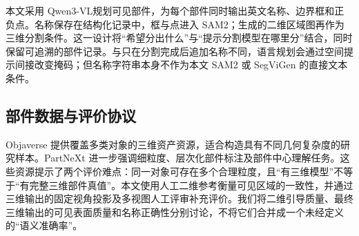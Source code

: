 本文采用 Qwen3-VL\citep{bai2025qwen3vl}规划可见部件，为每个部件同时输出英文名称、边界框和正负点。名称保存在结构化记录中，框与点进入 SAM2；生成的二维区域图再作为三维分割条件。这一设计将“希望分出什么”与“提示分割模型在哪里分”结合，同时保留可追溯的部件记录。与只在分割完成后追加名称不同，语言规划会通过空间提示间接改变掩码；但名称字符串本身不作为本文 SAM2 或 SegViGen 的直接文本条件。

\subsection{部件数据与评价协议}
Objaverse 提供覆盖多类对象的三维资产资源\citep{deitke2023objaverse}，适合构造具有不同几何复杂度的研究样本。PartNeXt 进一步强调细粒度、层次化部件标注及部件中心理解任务\citep{wang2025partnext}。这些资源提示了两个评价难点：同一对象可存在多个合理粒度，且“有三维模型”不等于“有完整三维部件真值”。本文使用人工二维参考衡量可见区域的一致性，并通过三维输出的固定视角投影及多视图人工评审补充评价。我们将二维引导质量、最终三维输出的可见表面质量和名称正确性分别讨论，不将它们合并成一个未经定义的“语义准确率”。
